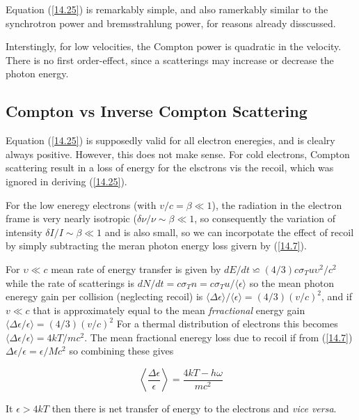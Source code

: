 \documentclass[a4paper,11pt,twoside]{article}
\begin{document}
    Equation (\ref{14.25}) is remarkably simple, and also ramerkably similar to the synchrotron power
    and bremsstrahlung power, for reasons already disscussed.

    Interstingly, for low velocities, the Compton power is quadratic in the velocity. There is no first
    order-effect, since a scatterings may increase or decrease the photon energy.

    \setcounter{subsection}{3}
    \subsection{Compton vs Inverse Compton Scattering}
    Equation (\ref{14.25}) is supposedly valid for all electron eneregies, and is clealry always positive.
    However, this does not make sense. For cold electrons, Compton scattering result in a loss of energy
    for the elsctrons vis the recoil, which was ignored in deriving (\ref{14.25}).

    For the low eneregy electrons (with $ v/c = \beta \ll 1$), the radiation in the electron frame is very
    nearly isotropic ($\delta \nu / \nu \sim \beta \ll 1$, so consequently the variation of intensity $\delta
    I/I \sim \beta \ll 1 $ and is also small, so we can incorpotate the effect of recoil by simply
    subtracting the meran photon energy loss givern by (\ref{14.7}).

    For $\upsilon \ll c $ mean rate of energy transfer is given by $ dE/ dt \backsimeq (4/3)c \sigma_{T}
    u \upsilon^2 / c^2 $ while the rate of scatterings is $dN/dt = c \sigma_{T} n = c \sigma_{T} u /
    \langle \epsilon \rangle $ so the mean photon eneregy gain per collision (neglecting recoil) is $
    \langle \Delta \epsilon \rangle / \langle \epsilon \rangle = (4/3)(v/c)^2 $, and if $v \ll c $ that is
    approximately equal to the mean \textit{frractional} energy gain $ \langle \Delta \epsilon /
    \epsilon \rangle = (4/3)(v/c)^2 $ For a thermal distribution of electrons this becomes $\langle \Delta
    \epsilon / \epsilon \rangle = 4kT/ mc^2 $. The mean fractional eneregy loss due to recoil if from
    (\ref{14.7}) $ \Delta \epsilon / \epsilon = \epsilon/ Mc^2 $ so combining these gives

    \begin{equation}
    \label{14.26}
    \left\langle \frac{\Delta \epsilon}{\epsilon} \right\rangle = \frac{4kT - h\omega}{m c^2}
    \tag{14.26}
    \end{equation}

    It $\epsilon > 4kT $ then there is net transfer of energy to the electrons and \textit{vice versa}.
\end{document}
